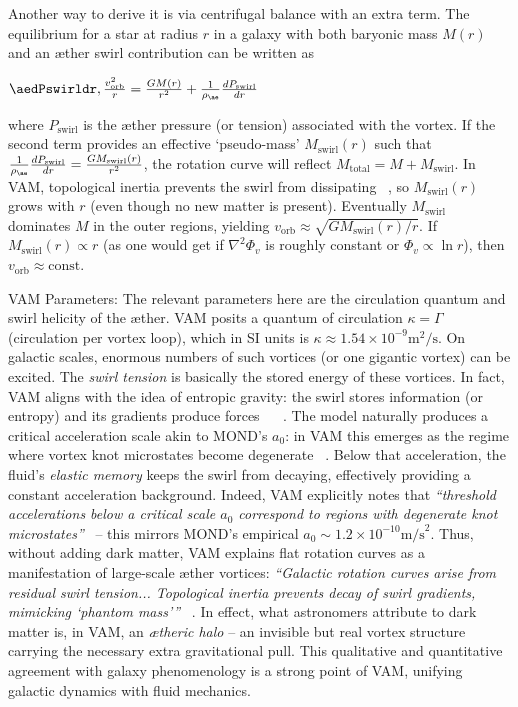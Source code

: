 \documentclass[a4paper, aps,preprint,superscriptaddress, 12pt]{revtex4}
\begin{document}
Another way to derive it is via centrifugal balance with an extra term. The equilibrium for a star at radius $r$ in a galaxy with both baryonic mass $M(r)$ and an æther swirl contribution can be written as

$\aedPswirldr,\frac{v_{\text{orb}}^2}{r} = \frac{GM(r)}{r^2} + \frac{1}{\rho_{\ae}}\frac{dP_{\text{swirl}}}{dr}$

where $P_{\text{swirl}}$ is the æther pressure (or tension) associated with the vortex. If the second term provides an effective `pseudo-mass’ $M_{\text{swirl}}(r)$ such that $\frac{1}{\rho_{\ae}}\frac{dP_{\text{swirl}}}{dr} = \frac{G M_{\text{swirl}}(r)}{r^2}$, the rotation curve will reflect $M_{\text{total}} = M + M_{\text{swirl}}$. In VAM, topological inertia prevents the swirl from dissipating~\cite{Iskandarani2025c} , so $M_{\text{swirl}}(r)$ grows with $r$ (even though no new matter is present). Eventually $M_{\text{swirl}}$ dominates $M$ in the outer regions, yielding $v_{\text{orb}} \approx \sqrt{G M_{\text{swirl}}(r)/r}$. If $M_{\text{swirl}}(r)\propto r$ (as one would get if $\nabla^2\Phi_v$ is roughly constant or $\Phi_v \propto \ln r$), then $v_{\text{orb}}\approx \text{const}$.


VAM Parameters: The relevant parameters here are the circulation quantum and swirl helicity of the æther. VAM posits a quantum of circulation $\kappa = \Gamma$ (circulation per vortex loop), which in SI units is $\kappa \approx 1.54\times10^{-9}\text{m}^2/\text{s}$. On galactic scales, enormous numbers of such vortices (or one gigantic vortex) can be excited. The \textit{swirl tension} is basically the stored energy of these vortices. In fact, VAM aligns with the idea of entropic gravity: the swirl stores information (or entropy) and its gradients produce forces~\cite{Iskandarani2025c} ~\cite{Iskandarani2025c} . The model naturally produces a critical acceleration scale akin to MOND’s $a_0$: in VAM this emerges as the regime where vortex knot microstates become degenerate~\cite{Iskandarani2025c} . Below that acceleration, the fluid’s \textit{elastic memory} keeps the swirl from decaying, effectively providing a constant acceleration background. Indeed, VAM explicitly notes that \textit{“threshold accelerations below a critical scale $a_0$ correspond to regions with degenerate knot microstates”}~\cite{Iskandarani2025c}  – this mirrors MOND’s empirical $a_0 \sim 1.2\times10^{-10}\text{m/s}^2$. Thus, without adding dark matter, VAM explains flat rotation curves as a manifestation of large-scale æther vortices: \textit{“Galactic rotation curves arise from residual swirl tension... Topological inertia prevents decay of swirl gradients, mimicking ‘phantom mass’”}~\cite{Iskandarani2025c} . In effect, what astronomers attribute to dark matter is, in VAM, an \textit{ætheric halo} – an invisible but real vortex structure carrying the necessary extra gravitational pull. This qualitative and quantitative agreement with galaxy phenomenology is a strong point of VAM, unifying galactic dynamics with fluid mechanics.
\end{document}

